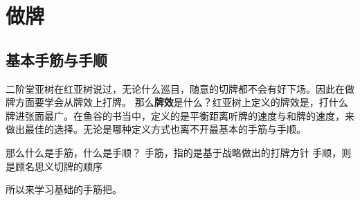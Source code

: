 \documentclass[小V的日麻笔记.tex]{subfiles}
\begin{document}
\chapter{做牌}
\section{基本手筋与手顺}
二阶堂亚树在红亚树说过，无论什么巡目，随意的切牌都不会有好下场。因此在做牌方面要学会从牌效上打牌。
那么\textbf{牌效}是什么？红亚树上定义的牌效是，打什么牌进张面最广。在鱼谷的书当中，定义的是平衡距离听牌的速度与和牌的速度，来做出最佳的选择。无论是哪种定义方式也离不开最基本的手筋与手顺。

那么什么是手筋，什么是手顺？
手筋，指的是基于战略做出的打牌方针
手顺，则是顾名思义切牌的顺序

所以来学习基础的手筋把。
\end{document}
